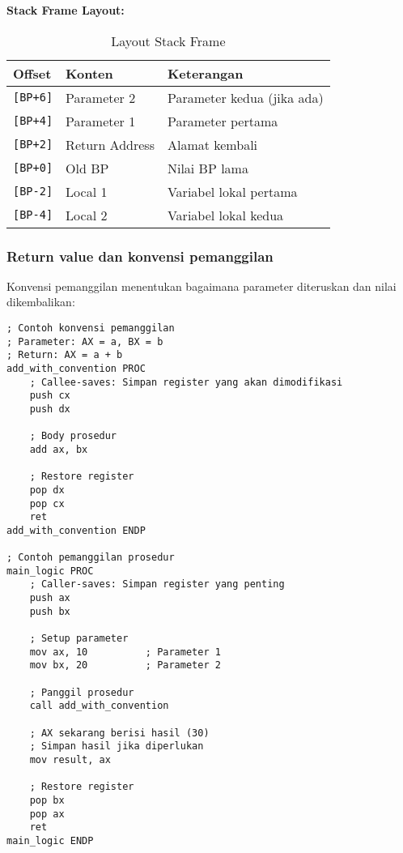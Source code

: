 \documentclass[../main.tex]{subfiles}
\begin{document}
                \textbf{Stack Frame Layout:}
                \begin{table}[H]
                    \centering
                    \caption{Layout Stack Frame}
                    \begin{tabular}{|p{2cm}|p{3cm}|p{6cm}|}
                        \hline
                        \textbf{Offset} & \textbf{Konten} & \textbf{Keterangan} \\
                        \hline
                        \texttt{[BP+6]} & Parameter 2 & Parameter kedua (jika ada) \\
                        \hline
                        \texttt{[BP+4]} & Parameter 1 & Parameter pertama \\
                        \hline
                        \texttt{[BP+2]} & Return Address & Alamat kembali \\
                        \hline
                        \texttt{[BP+0]} & Old BP & Nilai BP lama \\
                        \hline
                        \texttt{[BP-2]} & Local 1 & Variabel lokal pertama \\
                        \hline
                        \texttt{[BP-4]} & Local 2 & Variabel lokal kedua \\
                        \hline
                    \end{tabular}
                    \label{tab:stack-frame-layout}
                \end{table}

            \subsubsection{Return value dan konvensi pemanggilan}
                Konvensi pemanggilan menentukan bagaimana parameter diteruskan dan nilai dikembalikan:

                \begin{lstlisting}[language={[x86masm]Assembler}, caption=Konvensi Pemanggilan, label={lst:calling-convention}]
; Contoh konvensi pemanggilan
; Parameter: AX = a, BX = b
; Return: AX = a + b
add_with_convention PROC
    ; Callee-saves: Simpan register yang akan dimodifikasi
    push cx
    push dx
    
    ; Body prosedur
    add ax, bx
    
    ; Restore register
    pop dx
    pop cx
    ret
add_with_convention ENDP

; Contoh pemanggilan prosedur
main_logic PROC
    ; Caller-saves: Simpan register yang penting
    push ax
    push bx
    
    ; Setup parameter
    mov ax, 10          ; Parameter 1
    mov bx, 20          ; Parameter 2
    
    ; Panggil prosedur
    call add_with_convention
    
    ; AX sekarang berisi hasil (30)
    ; Simpan hasil jika diperlukan
    mov result, ax
    
    ; Restore register
    pop bx
    pop ax
    ret
main_logic ENDP
                \end{lstlisting}
\end{document}
